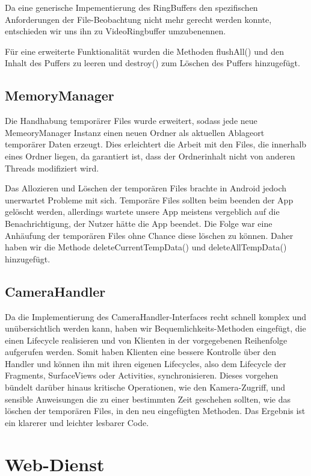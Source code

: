 Da eine generische Impementierung des RingBuffers den spezifischen Anforderungen der File-Beobachtung nicht mehr gerecht werden konnte, entschieden wir uns ihn zu VideoRingbuffer umzubenennen.  \par  

Für eine erweiterte Funktionalität wurden die Methoden flushAll() und den Inhalt des Puffers zu leeren und destroy() zum Löschen des Puffers hinzugefügt.

\subsection{MemoryManager} \label{MemoryManager}
Die Handhabung temporärer Files wurde erweitert, sodass jede neue MemeoryManager Instanz einen neuen Ordner als aktuellen Ablageort temporärer Daten erzeugt. Dies erleichtert die Arbeit mit den Files, die innerhalb eines Ordner liegen, da garantiert ist, dass der Ordnerinhalt nicht von anderen Threads modifiziert wird. \par
Das Allozieren und Löschen der temporären Files brachte in Android jedoch unerwartet Probleme mit sich. Temporäre Files sollten beim beenden der App gelöscht werden, allerdings wartete unsere App meistens vergeblich auf die Benachrichtigung, der Nutzer hätte die App beendet. Die Folge war eine Anhäufung der temporären Files ohne Chance diese löschen zu können. Daher haben wir die Methode deleteCurrentTempData() und deleteAllTempData() hinzugefügt. \par

\subsection{CameraHandler} \label{CameraHandler}
Da die Implementierung des CameraHandler-Interfaces recht schnell komplex und unübersichtlich werden kann, haben wir Bequemlichkeits-Methoden eingefügt, die einen Lifecycle realisieren und von Klienten in der vorgegebenen Reihenfolge aufgerufen werden. Somit haben Klienten eine bessere Kontrolle über den Handler und können ihn mit ihren eigenen Lifecycles, also dem Lifecycle der Fragments, SurfaceViews oder Activities, synchronisieren. Dieses vorgehen bündelt darüber hinaus kritische Operationen, wie den Kamera-Zugriff, und sensible Anweisungen die zu einer bestimmten Zeit geschehen sollten, wie das löschen der temporären Files, in den neu eingefügten Methoden. Das Ergebnis ist ein klarerer und leichter lesbarer Code.

\section{Web-Dienst}

